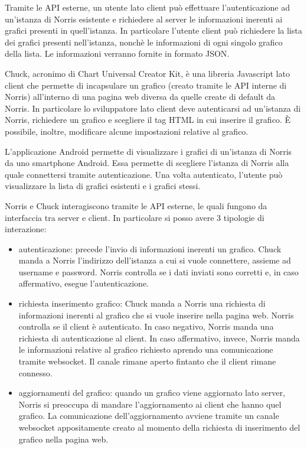    Tramite le API esterne, un utente lato client può effettuare l'autenticazione ad un'istanza di Norris esistente e richiedere al server le informazioni inerenti ai grafici presenti in quell'istanza. In particolare l'utente client può richiedere la lista dei grafici presenti nell'istanza, nonchè le informazioni di ogni singolo grafico della lista. Le informazioni verranno fornite in formato JSON.

    Chuck, acronimo di Chart Universal Creator Kit, è una libreria Javascript lato client che permette di incapsulare un grafico (creato tramite le API interne di Norris) all'interno di una pagina web diversa da quelle create di default da Norris. In particolare lo sviluppatore lato client deve autenticarsi ad un'istanza di Norris, richiedere un grafico e scegliere il tag HTML in cui inserire il grafico. È possibile, inoltre, modificare alcune impostazioni relative al grafico.
    
    L'applicazione Android permette di visualizzare i grafici di un'istanza di Norris da uno smartphone Android. Essa permette di scegliere l'istanza di Norris alla quale connettersi tramite autenticazione. Una volta autenticato, l'utente può visualizzare la lista di grafici esistenti e i grafici stessi.
        
    Norris e Chuck interagiscono tramite le API esterne, le quali fungono da interfaccia tra server e client. In particolare si posso avere 3 tipologie di interazione:
    \begin{itemize}
        \item autenticazione: precede l'invio di informazioni inerenti un grafico. Chuck manda a Norris l'indirizzo dell'istanza a cui si vuole connettere, assieme ad username e password. Norris controlla se i dati inviati sono corretti e, in caso affermativo, esegue l'autenticazione.
        \item richiesta inserimento grafico: Chuck manda a Norris una richiesta di informazioni inerenti al grafico che si vuole inserire nella pagina web. Norris controlla se il client è autenticato. In caso negativo, Norris manda una richiesta di autenticazione al client. In caso affermativo, invece, Norris manda le informazioni relative al grafico richiesto aprendo una comunicazione tramite websocket. Il canale rimane aperto fintanto che il client rimane connesso.
        \item aggiornamenti del grafico: quando un grafico viene aggiornato lato server, Norris si preoccupa di mandare l'aggiornamento ai client che hanno quel grafico. La comunicazione dell'aggiornamento avviene tramite un canale websocket appositamente creato al momento della richiesta di inserimento del grafico nella pagina web.
    \end{itemize}
    

